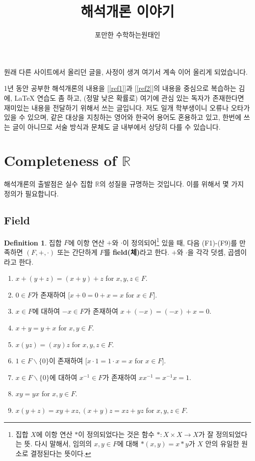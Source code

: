 \documentclass[12pt]{article}
\title{해석개론 이야기}
\author{포만한 수학하는원태인}
\theoremstyle{definition}
\newtheorem{defn}[thm]{Definition}
\def\RR{\mathbb{R}}
\begin{document}
\maketitle

\tableofcontents
\newpage

원래 다른 사이트에서 올리던 글을, 사정이 생겨 여기서 계속 이어 올리게 되었습니다.

1년 동안 공부한 해석개론의 내용을 [\ref{ref1}]과 [\ref{ref2}]의 내용을 중심으로 복습하는 김에, {\LaTeX} 연습도 좀 하고, (정말 낮은 확률로) 여기에 관심 있는 독자가 존재한다면 재미있는 내용을 전달하기 위해서 쓰는 글입니다. 저도 일개 학부생이니 오류나 오타가 있을 수 있으며, 같은 대상을 지칭하는 영어와 한국어 용어도 혼용하고 있고, 한번에 쓰는 글이 아니므로 서술 방식과 문체도 글 내부에서 상당히 다를 수 있습니다.

\section{Completeness of \(\RR\)}

해석개론의 출발점은 실수 집합 \(\RR\)의 성질을 규명하는 것입니다. 이를 위해서 몇 가지 정의가 필요합니다.

\subsection{Field}

	\begin{defn}
		집합 \(F\)에 이항 연산 \(+\)와 \(\cdot\)이 정의되어\footnote{집합 \(X\)에 이항 연산 \(*\)이 정의되었다는 것은 함수 \(*: X \times X \rightarrow X\)가 잘 정의되었다는 뜻. 다시 말해서, 임의의 \(x, y \in F\)에 대해 \(*(x, y) = x * y\)가 \(X\) 안의 유일한 원소로 결정된다는 뜻이다.} 있을 때, 다음 (F1)-(F9)를 만족하면 \((F, +, \cdot)\) 또는 간단하게 \(F\)를 \textbf{field(체)}라고 한다. \(+\)와 \(\cdot\)을 각각 덧셈, 곱셈이라고 한다.
		\begin{enumerate} [label=(F\arabic*), leftmargin=2\parindent]
			\item
			\(x + (y+z) = (x+y)+z\) for \(x, y, z \in F\).
			\item
			\(0 \in F\)가 존재하여 [\(x+0=0+x=x\) for \(x \in F\)].
			\item
			\(x \in F\)에 대하여 \(-x \in F\)가 존재하여 \mbox{\(x+(-x)=(-x)+x=0\).}
			\item
			\(x+y=y+x\) for \(x, y \in F\).
			\item
			\(x(yz)=(xy)z\) for \(x, y, z \in F\).
			\item
			\(1 \in F \backslash \{0\}\)이 존재하여 [\(x\cdot 1=1 \cdot x=x\) for \(x \in F\)].
			\item
			\(x \in F \backslash \{0\}\)에 대하여 \(x^{-1} \in F\)가 존재하여 \(xx^{-1}=x^{-1}x=1\).
			\item
			\(xy=yx\) for \(x, y \in F\).
			\item
			\(x(y+z)=xy+xz, (x+y)z = xz+yz\) for \(x, y, z \in F\).
		\end{enumerate}
	\end{defn}
	
\end{document}
